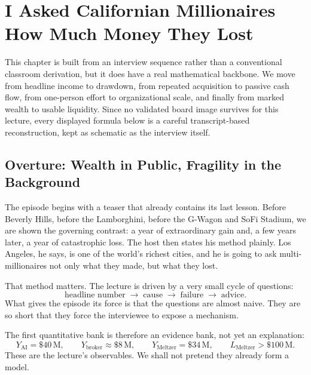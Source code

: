 \chapter{I Asked Californian Millionaires How Much Money They Lost}

This chapter is built from an interview sequence rather than a conventional classroom derivation, but it does have a real mathematical backbone. We move from headline income to drawdown, from repeated acquisition to passive cash flow, from one-person effort to organizational scale, and finally from marked wealth to usable liquidity. Since no validated board image survives for this lecture, every displayed formula below is a careful transcript-based reconstruction, kept as schematic as the interview itself.

\section{Overture: Wealth in Public, Fragility in the Background}

The episode begins with a teaser that already contains its last lesson. Before Beverly Hills, before the Lamborghini, before the G-Wagon and SoFi Stadium, we are shown the governing contrast: a year of extraordinary gain and, a few years later, a year of catastrophic loss. The host then states his method plainly. Los Angeles, he says, is one of the world's richest cities, and he is going to ask multi-millionaires not only what they made, but what they lost.

That method matters. The lecture is driven by a very small cycle of questions:
\[
\text{headline number} \;\longrightarrow\; \text{cause} \;\longrightarrow\; \text{failure} \;\longrightarrow\; \text{advice}.
\]
What gives the episode its force is that the questions are almost naive. They are so short that they force the interviewee to expose a mechanism.

The first quantitative bank is therefore an evidence bank, not yet an explanation:
\begin{equation}
Y_{\mathrm{AI}}=\$40\,\mathrm{M},\qquad
Y_{\mathrm{broker}}\approx \$8\,\mathrm{M},\qquad
Y_{\mathrm{Meltzer}}=\$34\,\mathrm{M},\qquad
L_{\mathrm{Meltzer}}>\$100\,\mathrm{M}.
\end{equation}
These are the lecture's observables. We shall not pretend they already form a model.

